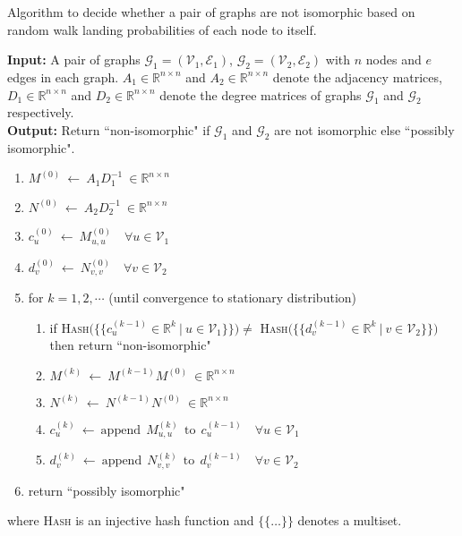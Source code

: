 \documentclass{article} \usepackage{iclr2021_conference,times}
\begin{document}
\begin{algorithm}
\caption{Algorithm to decide whether a pair of graphs are not isomorphic based on random walk landing probabilities of each node to itself.}


\textbf{Input:} A pair of graphs $\mathcal{G}_1 = (\mathcal{V}_1, \mathcal{E}_1)$, $\mathcal{G}_2 = (\mathcal{V}_2, \mathcal{E}_2)$ with $n$ nodes and $e$ edges in each graph. ${A}_1 \in \mathbb{R}^{n \times n}$ and ${A}_2 \in \mathbb{R}^{n \times n}$ denote the adjacency matrices, ${D}_1 \in \mathbb{R}^{n \times n}$ and ${D}_2 \in \mathbb{R}^{n \times n}$ denote the degree matrices of graphs $\mathcal{G}_1$ and $\mathcal{G}_2$ respectively.\\
\textbf{Output:} Return ``non-isomorphic" if $\mathcal{G}_1$ and $\mathcal{G}_2$ are not isomorphic else ``possibly isomorphic".
\begin{enumerate}
    \item $M^{(0)} \ \gets \ A_1 D_1^{-1} \ \in \mathbb{R}^{n \times n}$
    \item $N^{(0)} \ \gets \ A_2 D_2^{-1} \ \in \mathbb{R}^{n \times n}$
    \item $c_u^{(0)} \ \gets \ M^{(0)}_{u,u} \quad \forall u \in \mathcal{V}_1$
    \item $d_v^{(0)} \ \gets \ N^{(0)}_{v,v} \quad \forall v \in \mathcal{V}_2$
    \item for $k = 1, 2, \cdots $ (until convergence to stationary distribution)
    \begin{enumerate}
        \item if \textsc{Hash}$\Big(\{\{c_u^{(k-1)} \in \mathbb{R}^{k} \ | \ u \in \mathcal{V}_1\}\}\Big) \neq$ \textsc{Hash}$\Big(\{\{d_v^{(k-1)} \in \mathbb{R}^{k} \ | \ v \in \mathcal{V}_2\}\}\Big)$ then return ``non-isomorphic"
        \item $M^{(k)} \ \gets \ M^{(k-1)} M^{(0)}\ \in \mathbb{R}^{n \times n}$
        \item $N^{(k)} \ \gets \ N^{(k-1)} N^{(0)}\ \in \mathbb{R}^{n \times n}$
        \item $c_u^{(k)} \ \gets \ \text{append} \ \ M^{(k)}_{u,u} \ \ \text{to} \ \ c_u^{(k-1)}\quad \forall u \in \mathcal{V}_1$
        \item $d_v^{(k)} \ \gets \ \text{append} \ \ N^{(k)}_{v,v} \ \ \text{to} \ \ d_v^{(k-1)}\quad \forall v \in \mathcal{V}_2$
    \end{enumerate}
    \item return ``possibly isomorphic"
\end{enumerate}

\label{algo:rw_iso_test}
\end{algorithm}
where \textsc{Hash} is an injective hash function and $\{\{\ldots\}\}$ denotes a multiset.
\end{document}
